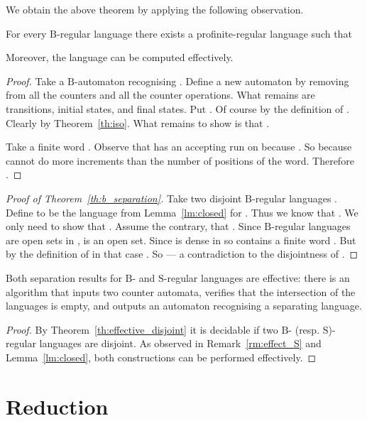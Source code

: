 \documentclass{LMCS}
\newcommand{\fB}{\ensuremath{\mathrm{B}}\xspace}
\newcommand{\fS}{\ensuremath{\mathrm{S}}\xspace}
\begin{document}
We obtain the above theorem by applying the following observation.

\begin{lemma}\label{lm:closed}
For every \fB-regular language  there exists a profinite-regular language  such that


Moreover, the language  can be computed effectively.
\end{lemma}

\begin{proof}
Take a \fB-automaton  recognising . Define a new automaton  by removing from  all the counters and all the counter operations. What remains are transitions, initial states, and final states. Put . Of course  by the definition of . Clearly  by Theorem~\ref{th:iso}. What remains to show is that . 

Take a finite word . Observe that  has an accepting run on  because . So  because  cannot do more increments than the number of positions of the word. Therefore .
\end{proof}

\begin{proof}[Proof of Theorem~\ref{th:b_separation}]
Take two disjoint \fB-regular languages . Define  to be the language  from Lemma~\ref{lm:closed} for . Thus we know that . We only need to show that . Assume the contrary, that . Since \fB-regular languages are open sets in ,  is an open set. Since  is dense in  so  contains a finite word . But by the definition of  in that case . So  --- a contradiction to the disjointness of .
\end{proof}

\begin{remark}\label{rm:effect_prof}
Both separation results for \fB- and \fS-regular languages are effective: there is an algorithm that inputs two counter automata, verifies that the intersection of the languages is empty, and outputs an automaton recognising a separating language.
\end{remark}

\begin{proof}
By Theorem~\ref{th:effective_disjoint} it is decidable if two \fB- (resp. \fS)-regular languages are disjoint. As observed in Remark~\ref{rm:effect_S} and Lemma~\ref{lm:closed}, both constructions can be performed effectively.
\end{proof}



\section{Reduction}\label{s:reduction}
\end{document}
